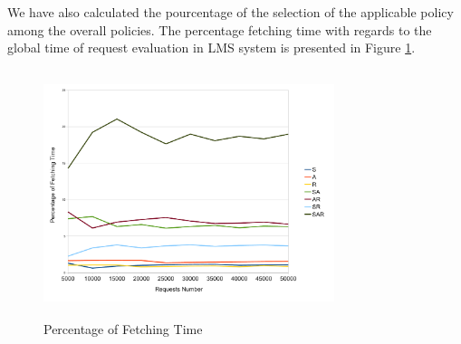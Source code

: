 We have also calculated the pourcentage of the selection of the applicable policy among the overall policies. The percentage fetching time with regards to the 
global time of request evaluation in LMS system is presented in Figure \ref{Fetching Time}.
  

\begin{figure}[!h]
  \centering
\includegraphics[width=8.5cm, height=7.2cm]{fetching.pdf}
\begin{center}
\caption{Percentage of Fetching Time}
\label{Fetching Time}
\end{center}
\end{figure} 
